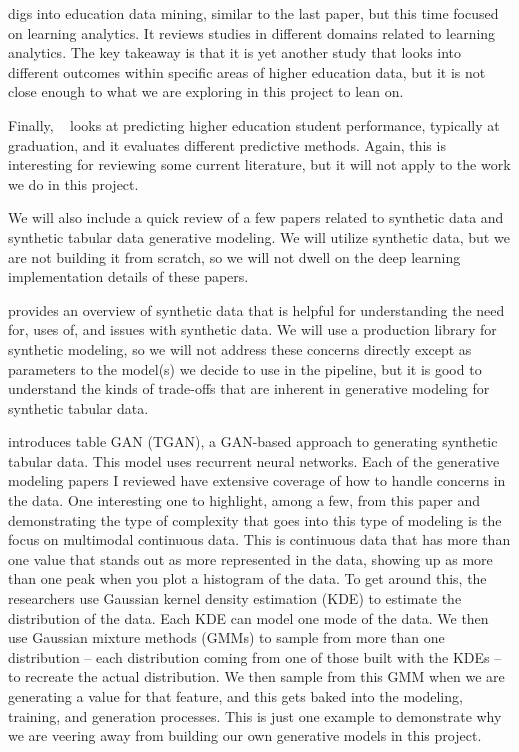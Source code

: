 \documentclass[sigconf, authorversion, nonacm]{acmart}
\begin{document}
    \cite{ALDOWAH201913} digs into education data mining, similar to the last paper, but this time focused on learning analytics. It reviews studies in different domains related to learning analytics. The key takeaway is that it is yet another study that looks into different outcomes within specific areas of higher education data, but it is not close enough to what we are exploring in this project to lean on.

    Finally, ~\cite{https://doi.org/10.1155/2022/8924028} looks at predicting higher education student performance, typically at graduation, and it evaluates different predictive methods. Again, this is interesting for reviewing some current literature, but it will not apply to the work we do in this project.

    We will also include a quick review of a few papers related to synthetic data and synthetic tabular data generative modeling. We will utilize synthetic data, but we are not building it from scratch, so we will not dwell on the deep learning implementation details of these papers.

    \cite{decristofaro2024syntheticdatamethodsuse} provides an overview of synthetic data that is helpful for understanding the need for, uses of, and issues with synthetic data. We will use a production library for synthetic modeling, so we will not address these concerns directly except as parameters to the model(s) we decide to use in the pipeline, but it is good to understand the kinds of trade-offs that are inherent in generative modeling for synthetic tabular data.

    \cite{DBLP:journals/corr/abs-1811-11264} introduces table GAN (TGAN), a GAN-based approach to generating synthetic tabular data. This model uses recurrent neural networks. Each of the generative modeling papers I reviewed have extensive coverage of how to handle concerns in the data. One interesting one to highlight, among a few, from this paper and demonstrating the type of complexity that goes into this type of modeling is the focus on multimodal continuous data. This is continuous data that has more than one value that stands out as more represented in the data, showing up as more than one peak when you plot a histogram of the data. To get around this, the researchers use Gaussian kernel density estimation (KDE) to estimate the distribution of the data. Each KDE can model one mode of the data. We then use Gaussian mixture methods (GMMs) to sample from more than one distribution -- each distribution coming from one of those built with the KDEs -- to recreate the actual distribution. We then sample from this GMM when we are generating a value for that feature, and this gets baked into the modeling, training, and generation processes. This is just one example to demonstrate why we are veering away from building our own generative models in this project.
\end{document}
